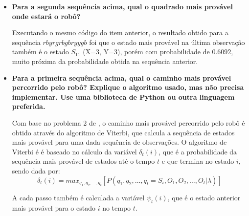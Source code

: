 \begin{itemize}
    \item \textbf{Para a segunda sequência acima, qual o quadrado mais provável onde estará o robô?}
    
    \begin{tcolorbox}[title=Resposta:]
        Executando o mesmo código do item anterior, o resultado obtido para a sequência \( r b y r g r b g b r y y g b \) foi que o estado mais provável na última observação também é o estado \( S_{11} \) (X=3, Y=3), porém com probabilidade de $0.6092$, muito próxima da probabilidade obtida na sequência anterior.
    \end{tcolorbox}

    \item \textbf{Para a primeira sequência acima, qual o caminho mais provável percorrido pelo robô? Explique o algoritmo usado, mas não precisa implementar. Use uma biblioteca de Python ou outra linguagem preferida.}
    \begin{tcolorbox}[title=Resposta:]
        Com base no problema 2 de \cite{Rabiner1989}, o caminho mais provável percorrido pelo robô é obtido através do algoritmo de Viterbi, que calcula a sequência de estados mais provável para uma dada sequência de observações. O algoritmo de Viterbi é é baseado no cálculo da variável \( \delta_t(i) \), que é a probabilidade da sequência mais provável de estados até o tempo \( t \) e que termina no estado \( i \), sendo dada por:
        \begin{equation}
            \delta_{t}(i) = max_{q_1, q_2, \ldots, q_t} [P(q_1, q_2, \ldots, q_t = S_i, O_1, O_2, \ldots, O_{t} | \lambda)]
        \end{equation}

        A cada passo também é calculada a variável \( \psi_t(i) \), que é o estado anterior mais provável para o estado \( i \) no tempo \( t \).


\end{tcolorbox}
\end{itemize}
